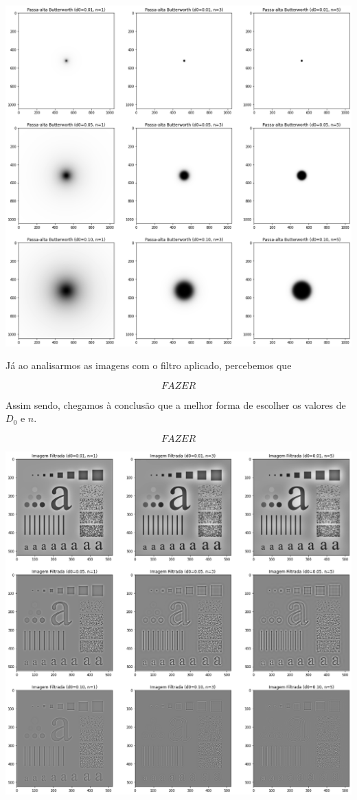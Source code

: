 \documentclass[12pt,a4paper]{article}
\begin{document}
\vspace{1em}
\begin{center}
	\includegraphics[width=\textwidth]{filtros_high_pass}
\end{center}
\vspace{1em}

Já ao analisarmos as imagens com o filtro aplicado, percebemos que 

\[FAZER\]

Assim sendo, chegamos à conclusão que a melhor forma de escolher os valores de $D_0$ e $n$.

\[FAZER\]

\vspace{1em}
\begin{center}
	\includegraphics[width=\textwidth]{imagens_high_pass}
\end{center}
\vspace{1em}

\newpage

\nocite{comin2020}
\nocite{wiki01}



\end{document}
